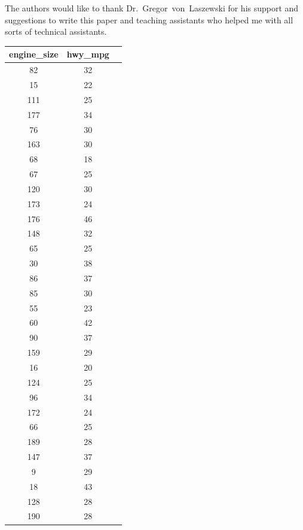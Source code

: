 \begin{acks}

  The authors would like to thank Dr.~Gregor~von~Laszewski for his
  support and suggestions to write this paper and teaching assistants who
  helped me with all sorts of technical assistants.

\end{acks}

\begin{table}[htb]
  \centering
   \begin{tabular}{|c|c| p{5cm}|}
   \hline{}
    engine\_size & hwy\_mpg \\ \hline
     82  & 32 \\ \hline
     15  & 22 \\ \hline
     111 & 25 \\ \hline 
     177 & 34 \\ \hline
     76  & 30 \\ \hline
     163 & 30 \\ \hline
     68  & 18 \\ \hline
     67  & 25 \\ \hline
     120 & 30 \\ \hline
     173 & 24 \\ \hline
     176 & 46 \\ \hline
     148 & 32 \\ \hline
     65  & 25 \\ \hline
     30  & 38 \\ \hline
     86  & 37 \\ \hline
     85  & 30 \\ \hline
     55  & 23 \\ \hline
     60  & 42 \\ \hline
     90  & 37 \\ \hline
     159 & 29 \\ \hline
     16  & 20 \\ \hline
     124 & 25 \\ \hline
     96  & 34 \\ \hline
     172 & 24 \\ \hline
     66  & 25 \\ \hline
     189 & 28 \\ \hline
     147 & 37 \\ \hline
     9   & 29 \\ \hline
     18  & 43 \\ \hline
     128 & 28 \\ \hline
     190 & 28 \\ \hline

\end{tabular}
\end{table}
